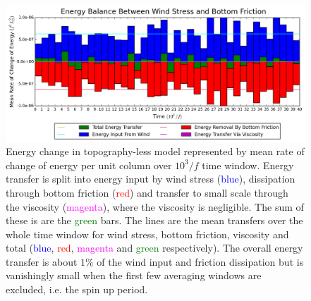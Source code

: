 \documentclass[12pt,a4paper]{report}
\begin{document}
  \begin{figure}
  	\centering
  	\includegraphics[width=\linewidth]{notopenergy}
  	\caption{Energy change in topography-less model represented by mean rate of change of energy per unit column over $10^{3}/f$ time window. Energy transfer is split into 
  		energy input by wind stress (\textcolor{blue}{blue}), dissipation through bottom friction (\textcolor{red}{red}) and transfer to small scale through the viscosity
  		(\textcolor{magenta}{magenta}), where the viscosity is negligible. The sum of these
  		is are the \textcolor{green}{green} bars. The lines are the mean transfers over the whole time window for wind stress, bottom friction, viscosity and total (\textcolor{blue}{blue}, \textcolor{red}{red}, \textcolor{magenta}{magenta} and \textcolor{green}{green} respectively). The overall energy transfer is about $1\%$
  		of the wind input and friction dissipation but is vanishingly small when the first
  		few averaging windows are excluded, i.e. the spin up period.}
  	\label{fig:notopenergy}
  \end{figure}
  
  
  
\end{document}
